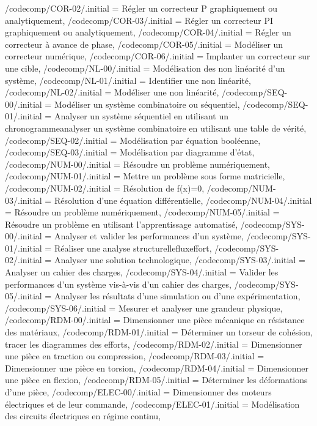 {    /codecomp/COR-02/.initial = Régler un correcteur P graphiquement ou analytiquement,
    /codecomp/COR-03/.initial = Régler un correcteur PI graphiquement ou analytiquement,
    /codecomp/COR-04/.initial = Régler un correcteur à avance de phase,
    /codecomp/COR-05/.initial = Modéliser un correcteur numérique,
    /codecomp/COR-06/.initial = Implanter un correcteur sur une cible,
    /codecomp/NL-00/.initial = Modélisation des non linéarité d'un système,
    /codecomp/NL-01/.initial = Identifier une non linéarité,
    /codecomp/NL-02/.initial = Modéliser une non linéarité,
    /codecomp/SEQ-00/.initial = Modéliser un système combinatoire ou séquentiel,
    /codecomp/SEQ-01/.initial = Analyser un système séquentiel en utilisant un chronogramme\CommaXp analyser un système combinatoire en utilisant une table de vérité,
    /codecomp/SEQ-02/.initial = Modélisation par équation booléenne,
    /codecomp/SEQ-03/.initial = Modélisation par diagramme d'état,
    /codecomp/NUM-00/.initial = Résoudre un problème numériquement,
    /codecomp/NUM-01/.initial = Mettre un problème sous forme matricielle,
    /codecomp/NUM-02/.initial = Résolution de f(x)=0,
    /codecomp/NUM-03/.initial = Résolution d'une équation différentielle,
    /codecomp/NUM-04/.initial = Résoudre un problème numériquement,
    /codecomp/NUM-05/.initial = Résoudre un problème en utilisant l'apprentissage automatisé,
    /codecomp/SYS-00/.initial = Analyser et valider les performances d'un système,
    /codecomp/SYS-01/.initial = Réaliser une analyse structurelle\CommaXp flux\CommaXp effort,
    /codecomp/SYS-02/.initial = Analyser une solution technologique,
    /codecomp/SYS-03/.initial = Analyser un cahier des charges,
    /codecomp/SYS-04/.initial = Valider les performances d'un système vis-à-vis d'un cahier des charges,
    /codecomp/SYS-05/.initial = Analyser les résultats d'une simulation ou d'une expérimentation,
    /codecomp/SYS-06/.initial = Mesurer et analyser une grandeur physique,
	/codecomp/RDM-00/.initial = Dimensionner une pièce mécanique en résistance des matériaux,
	/codecomp/RDM-01/.initial = Déterminer un torseur de cohésion, tracer les diagrammes des efforts,
	/codecomp/RDM-02/.initial = Dimensionner une pièce en traction ou compression,
	/codecomp/RDM-03/.initial = Dimensionner une pièce en torsion,
	/codecomp/RDM-04/.initial = Dimensionner une pièce en flexion,
	/codecomp/RDM-05/.initial = Déterminer les déformations d'une pièce,
	/codecomp/ELEC-00/.initial = Dimensionner des moteurs électriques et de leur commande,
	/codecomp/ELEC-01/.initial = Modélisation des circuits électriques en régime continu,
}
